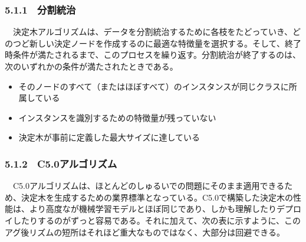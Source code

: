 \documentclass[
]{article}
\begin{document}
\subsubsection{5.1.1　分割統治}\label{ux5206ux5272ux7d71ux6cbb}

　決定木アルゴリズムは、データを分割統治するために各枝をたどっていき、どのつど新しい決定ノードを作成するのに最適な特徴量を選択する。そして、終了時条件が満たされるまで、このプロセスを繰り返す。分割統治が終了するのは、次のいずれかの条件が満たされたときである。

\begin{itemize}
\item
  そのノードのすべて（またはほぼすべて）のインスタンスが同じクラスに所属している
\item
  インスタンスを識別するための特徴量が残っていない
\item
  決定木が事前に定義した最大サイズに達している
\end{itemize}

\subsubsection{5.1.2　C5.0アルゴリズム}\label{c5.0ux30a2ux30ebux30b4ux30eaux30baux30e0}

　C5.0アルゴリズムは、ほとんどのしゅるいでの問題にそのまま適用できるため、決定木を生成するための業界標準となっている。C5.0で構築した決定木の性能は、より高度なが機械学習モデルとほぼ同じであり、しかも理解したりデプロイしたりするのがずっと容易である。それに加えて、次の表に示すように、このアグ後リズムの短所はそれほど重大なものではなく、大部分は回避できる。
\end{document}
